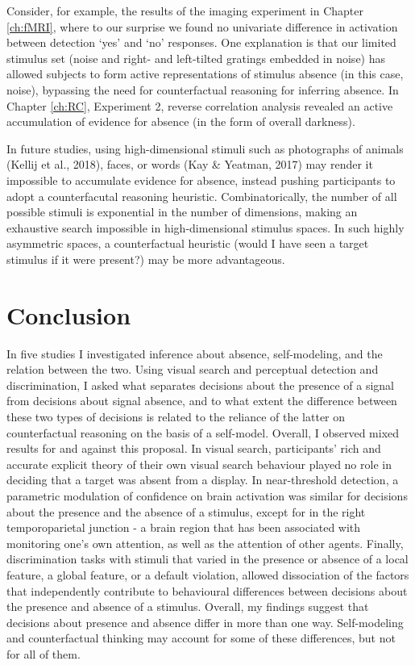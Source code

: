 \documentclass[12pt,twoside]{reedthesis}
\begin{document}
Consider, for example, the results of the imaging experiment in Chapter \ref{ch:fMRI}, where to our surprise we found no univariate difference in activation between detection `yes' and `no' responses. One explanation is that our limited stimulus set (noise and right- and left-tilted gratings embedded in noise) has allowed subjects to form active representations of stimulus absence (in this case, noise), bypassing the need for counterfactual reasoning for inferring absence. In Chapter \ref{ch:RC}, Experiment 2, reverse correlation analysis revealed an active accumulation of evidence for absence (in the form of overall darkness).

In future studies, using high-dimensional stimuli such as photographs of animals (Kellij et al., 2018), faces, or words (Kay \& Yeatman, 2017) may render it impossible to accumulate evidence for absence, instead pushing participants to adopt a counterfacutal reasoning heuristic. Combinatorically, the number of all possible stimuli is exponential in the number of dimensions, making an exhaustive search impossible in high-dimensional stimulus spaces. In such highly asymmetric spaces, a counterfactual heuristic (would I have seen a target stimulus if it were present?) may be more advantageous.

\hypertarget{conclusion-2}{%
\section*{Conclusion}\label{conclusion-2}}

In five studies I investigated inference about absence, self-modeling, and the relation between the two. Using visual search and perceptual detection and discrimination, I asked what separates decisions about the presence of a signal from decisions about signal absence, and to what extent the difference between these two types of decisions is related to the reliance of the latter on counterfactual reasoning on the basis of a self-model. Overall, I observed mixed results for and against this proposal. In visual search, participants' rich and accurate explicit theory of their own visual search behaviour played no role in deciding that a target was absent from a display. In near-threshold detection, a parametric modulation of confidence on brain activation was similar for decisions about the presence and the absence of a stimulus, except for in the right temporoparietal junction - a brain region that has been associated with monitoring one's own attention, as well as the attention of other agents. Finally, discrimination tasks with stimuli that varied in the presence or absence of a local feature, a global feature, or a default violation, allowed dissociation of the factors that independently contribute to behavioural differences between decisions about the presence and absence of a stimulus. Overall, my findings suggest that decisions about presence and absence differ in more than one way. Self-modeling and counterfactual thinking may account for some of these differences, but not for all of them.
\end{document}
